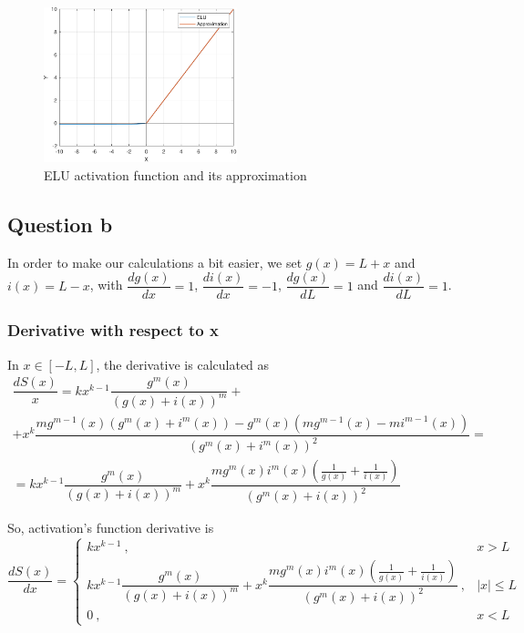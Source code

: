 \begin{figure}[H]
	\centering
	\includegraphics[width=0.5\textwidth]{../Problem 7/prob7_elu.pdf}
	\caption{ELU activation function and its approximation}
	\label{fig:prob7_elu}
\end{figure}


\subsection{Question b}
In order to make our calculations a bit easier, we set $g(x) = L+x$ and $i(x) = L-x$, with $\dfrac{dg(x)}{dx} = 1$, $\dfrac{di(x)}{dx} = -1$, $\dfrac{dg(x)}{dL} = 1$ and $\dfrac{di(x)}{dL} = 1$.

\subsubsection{Derivative with respect to x}
In $x \in \left[-L, L\right]$, the derivative is calculated as
\[
\begin{gathered}
\dfrac{dS(x)}{x} = kx^{k-1} \dfrac{g^m(x)}{\left(g(x)+i(x)\right)^m} + \\[1mm]
+ x^k\dfrac{mg^{m-1}(x) \left( g^m(x) + i^m(x) \right) - g^m(x) \left( mg^{m-1}(x) - mi^{m-1}(x)\right)}{\left( g^m(x) + i^m(x) \right)^2} = \\[1mm]
= kx^{k-1} \dfrac{g^m(x)}{\left(g(x)+i(x)\right)^m} + x^k \dfrac{mg^m(x) i^m(x) \left( \frac{1}{g(x)} + \frac{1}{i(x)} \right)}{\left(g^m(x) + i(x)\right)^2}
\end{gathered}
\]

So, activation's function derivative is 
\begin{equation}
\frac{dS(x)}{dx} = \left\{
\begin{array}{cc}
	kx^{k-1} \ , & x>L\\[1mm]
	kx^{k-1} \dfrac{g^m(x)}{\left(g(x)+i(x)\right)^m} + x^k \dfrac{mg^m(x) i^m(x) \left( \frac{1}{g(x)} + \frac{1}{i(x)} \right)}{\left(g^m(x) + i(x)\right)^2}\ , & \left|x\right| \le L\\[1mm]
	0\ , & x<L
\end{array}
\right.
\end{equation}

